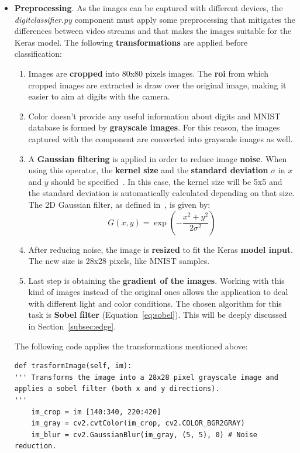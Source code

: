 \begin{itemize}
	\item \textbf{Preprocessing}. As the images can be captured with different devices, the \textit{digitclassifier.py} component must apply some preprocessing that mitigates the differences between video streams and that makes the images suitable for the Keras model. The following \textbf{transformations} are applied before classification:
	\begin{enumerate}
		\item Images are \textbf{cropped} into 80x80 pixels images. The \textbf{\gls{roi}} from which cropped images are extracted is draw over the original image, making it easier to aim at digits with the camera.
		\item Color doesn't provide any useful information about digits and MNIST database is formed by \textbf{grayscale images}. For this reason, the images captured with the component are converted into grayscale images as well. 
		\item A \textbf{Gaussian filtering} is applied in order to reduce image \textbf{noise}. When using this operator, the \textbf{kernel size} and the \textbf{standard deviation} $\sigma$ in $x$ and $y$ should be specified~\cite{itseez2014theopencv}. In this case, the kernel size will be 5x5 and the standard deviation is automatically calculated depending on that size. The 2D Gaussian filter, as defined in~\cite{sonka1999image}, is given by:
		\begin{equation}
		G(x,y)=\exp(-\frac{x^2+y^2}{2\sigma^2})
		\end{equation}
		\item After reducing noise, the image is \textbf{resized} to fit the Keras \textbf{model input}. The new size is 28x28 pixels, like MNIST samples.
		\item Last step is obtaining the \textbf{gradient of the images}. Working with this kind of images instead of the original ones allows the application to deal with different light and color conditions. The chosen algorithm for this task is \textbf{Sobel filter} (Equation~\ref{eq:sobel}). This will be deeply discussed in Section~\ref{subsec:edge}.
	\end{enumerate}
	
	The following code applies the transformations mentioned above:
\begin{lstlisting}[frame=single]
def trasformImage(self, im):
''' Transforms the image into a 28x28 pixel grayscale image and
applies a sobel filter (both x and y directions).
''' 
	im_crop = im [140:340, 220:420]
	im_gray = cv2.cvtColor(im_crop, cv2.COLOR_BGR2GRAY)
	im_blur = cv2.GaussianBlur(im_gray, (5, 5), 0) # Noise reduction.
	

\end{lstlisting}
\end{itemize}
